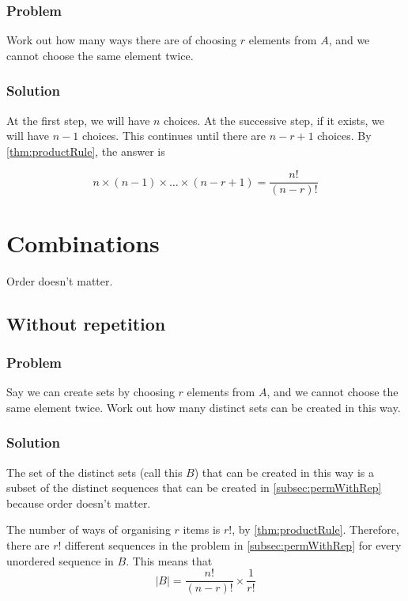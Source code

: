 \documentclass[a4paper,12pt]{article}
\begin{document}
\subsubsection{Problem}
Work out how many ways there are of choosing $r$ elements from $A$, and we cannot choose the same element twice.

\subsubsection{Solution}
At the first step, we will have $n$ choices. At the successive step, if it exists, we will have $n-1$ choices. This continues until there are $n-r+1$ choices. By \cref{thm:productRule}, the answer is

\begin{equation}
   n \times (n-1) \times \ldots \times (n-r+1) = \frac{n!}{(n-r)!}
\end{equation}

\section{Combinations}
Order doesn't matter.
\subsection{Without repetition}
\subsubsection{Problem}
Say we can create sets by choosing $r$ elements from $A$, and we cannot choose the same element twice. Work out how many distinct sets can be created in this way.

\subsubsection{Solution}
The set of the distinct sets (call this $B$) that can be created in this way is a subset of the distinct sequences that can be created in \cref{subsec:permWithRep} because order doesn't matter.

The number of ways of organising $r$ items is $r!$, by \cref{thm:productRule}. Therefore, there are $r!$ different sequences in the problem in \cref{subsec:permWithRep} for every unordered sequence in $B$. This means that
\begin{equation}
  |B| = \frac{n!}{(n-r)!} \times \frac{1}{r!}
\end{equation}
\end{document}
